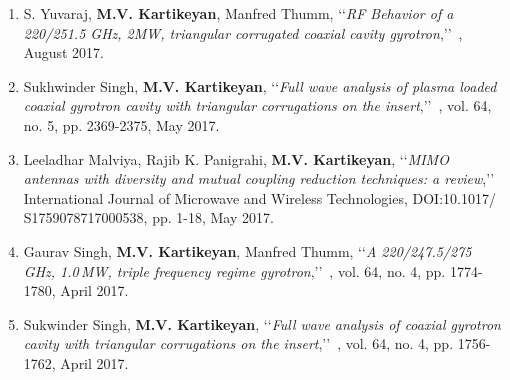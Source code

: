 

\begin{enumerate}


	\item
	S. Yuvaraj, \textbf{M.V. Kartikeyan}, Manfred Thumm, \lq\lq \textit{RF Behavior of a 220/251.5 GHz, 2MW, triangular corrugated coaxial cavity gyrotron},\rq\rq\, {\color{magenta}{IEEE Trans. Electron Devices (Accepted)}}, August 2017.
	
	\item
	Sukhwinder Singh, \textbf{M.V. Kartikeyan}, \lq\lq \textit{Full wave analysis of plasma loaded coaxial gyrotron cavity with triangular corrugations on the insert},\rq\rq\, {\color{magenta}{IEEE Trans. Electron Devices}}, vol. 64, no. 5, pp. 2369-2375, May 2017.
	
	\item
	Leeladhar Malviya, Rajib K. Panigrahi, \textbf{M.V. Kartikeyan}, \lq\lq \textit{MIMO antennas with diversity and mutual coupling reduction techniques: a review},\rq\rq\, International Journal of Microwave and Wireless Technologies, DOI:10.1017/ S1759078717000538, pp. 1-18, May 2017.
	
	\item
	Gaurav Singh, \textbf{M.V. Kartikeyan}, Manfred Thumm, \lq\lq \textit{A 220/247.5/275 GHz, 1.0\,MW, triple frequency regime gyrotron},\rq\rq\, {\color{magenta}{IEEE Trans. Electron Devices}}, vol. 64, no. 4, pp. 1774-1780, April 2017.
	
	\item
	Sukwinder Singh, \textbf{M.V. Kartikeyan}, \lq\lq \textit{Full wave analysis of coaxial gyrotron cavity with triangular corrugations on the insert},\rq\rq\, {\color{magenta}{IEEE Trans. Electron Devices}}, vol. 64, no. 4, pp. 1756-1762, April 2017.

\end{enumerate}